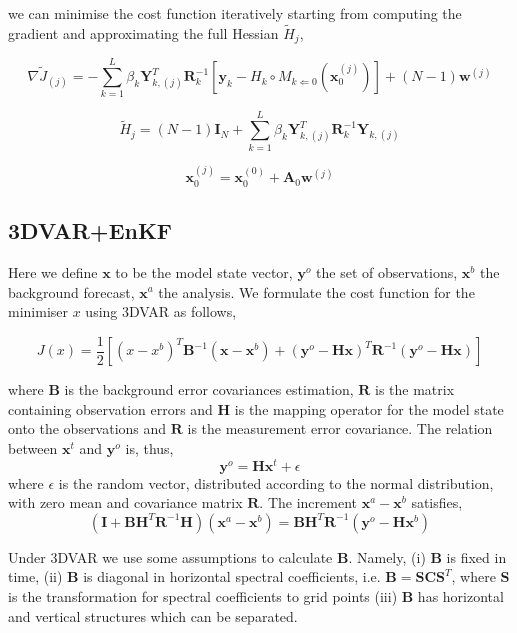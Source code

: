 \documentclass[a4,12pt]{article}
\begin{document}
we can minimise the cost function iteratively starting from computing the gradient and approximating the full Hessian $\tilde{H}_{j}$,

$$\nabla \tilde{J}_{(j)} = -\sum_{k=1}^{L}\beta_{k}\textbf{Y}_{k,(j)}^{T}\textbf{R}_{k}^{-1}[\textbf{y}_{k} - H_{k}\circ M_{k\Leftarrow 0}(\textbf{x}_{0}^{(j)})] + (N-1)\textbf{w}^{(j)}$$

$$\tilde{H}_{j}=(N-1)\textbf{I}_{N}+\sum_{k=1}^{L} \beta_{k} \textbf{Y}_{k,(j)}^{T}\textbf{R}^{-1}_{k} \textbf{Y}_{k,(j)} $$

$$\textbf{x}_{0}^{(j)} = \textbf{x}_{0}^{(0)} + \textbf{A}_{0}\textbf{w}^{(j)}$$

\subsection{3DVAR+EnKF}
Here we define $\textbf{x}$ to be the model state vector, $\textbf{y}^{o}$ the set of observations, $\textbf{x}^{b}$ the background forecast, $\textbf{x}^{a}$ the analysis. We formulate the cost function for the minimiser $x$ using 3DVAR as follows,

$$J(x) = \frac{1}{2}[(x-x^{b})^{T}\textbf{B}^{-1}(\textbf{x}-\textbf{x}^{b})+(\textbf{y}^{o}-\textbf{H}\textbf{x})^{T}\textbf{R}^{-1}(\textbf{y}^{o}-\textbf{Hx})]$$

where $\textbf{B}$ is the background error covariances estimation, $\textbf{R}$ is the matrix containing observation errors and $\textbf{H}$ is the mapping operator for the model state onto the observations and  $\textbf{R}$ is the measurement error covariance. The relation between $\textbf{x}^{t}$ and $\textbf{y}^{o}$ is, thus, $$\textbf{y}^{o} = \textbf{H}\textbf{x}^{t} + \epsilon$$ where $\epsilon$ is the random vector, distributed according to the normal distribution, with zero mean and covariance matrix $\textbf{R}$. The increment $\textbf{x}^{a} - \textbf{x}^{b}$ satisfies, 
$$(\textbf{I} + \textbf{BH}^{T}\textbf{R}^{-1}\textbf{H})(\textbf{x}^{a}-\textbf{x}^{b}) = \textbf{B}\textbf{H}^{T}\textbf{R}^{-1}(\textbf{y}^{o}-\textbf{H}\textbf{x}^{b})$$   

Under 3DVAR we use some assumptions to calculate $\textbf{B}$. Namely, (i) $\textbf{B}$ is fixed in time, (ii) $\textbf{B}$ is diagonal in horizontal spectral coefficients, i.e. $\textbf{B} = \textbf{S}\textbf{C}\textbf{S}^{T}$, where $\textbf{S}$ is the transformation for spectral coefficients to grid points (iii) $\textbf{B}$ has horizontal and vertical structures which can be separated. 
\end{document}
